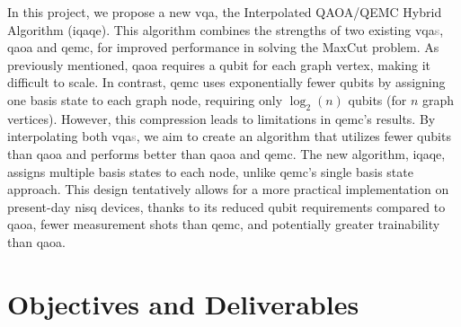 

In this project, we propose a new \acrshort{vqa}, the Interpolated QAOA/QEMC Hybrid Algorithm (\acrshort{iqaqe}). This algorithm combines the strengths of two existing \acrshort{vqa}\textcolor{gray}{s}, \acrshort{qaoa} and \acrshort{qemc}, for improved performance in solving the MaxCut problem. As previously mentioned, \acrshort{qaoa} requires a qubit for each graph vertex, making it difficult to scale. In contrast, \acrshort{qemc} uses exponentially fewer qubits by assigning one basis state to each graph node, requiring only $\log_2(n)$ qubits (for $n$ graph vertices). However, this compression leads to limitations in \acrshort{qemc}'s results. By interpolating both \acrshort{vqa}\textcolor{gray}{s}, we aim to create an algorithm that utilizes fewer qubits than \acrshort{qaoa} and performs better than \acrshort{qaoa} and \acrshort{qemc}. The new algorithm, \acrshort{iqaqe}, assigns multiple basis states to each node, unlike \acrshort{qemc}'s single basis state approach. This design tentatively allows for a more practical implementation on present-day \acrshort{nisq} devices, thanks to its reduced qubit requirements compared to \acrshort{qaoa}, fewer measurement shots than \acrshort{qemc}, and potentially greater trainability than \acrshort{qaoa}.

\section{Objectives and Deliverables}
\label{section:objectives}





